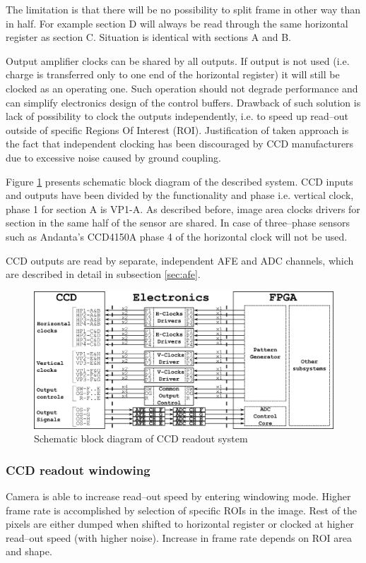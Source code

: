 The limitation is that there will be no possibility to split frame in other way than in half. For example section D will always be read through the same horizontal register as section C. Situation is identical with sections A and B.

Output amplifier clocks can be shared by all outputs. If output is not used (i.e. charge is transferred only to one end of the horizontal register) it will still be clocked as an operating one. Such operation should not degrade performance and can simplify electronics design of the control buffers. Drawback of such solution is lack of possibility to clock the outputs independently, i.e. to speed up read--out outside of specific Regions Of Interest (ROI). Justification of taken approach is the fact that independent clocking has been discouraged by CCD manufacturers due to excessive noise caused by ground coupling.


Figure \ref{fig:CCD_Readout} presents schematic block diagram of the described system. CCD inputs and outputs have been divided by the functionality and phase i.e. vertical clock, phase 1 for section A is VP1-A. As described before, image area clocks drivers for section in the same half of the sensor are shared. In case of three--phase sensors such as Andanta's CCD4150A phase 4 of the horizontal clock will not be used.


CCD outputs are read by separate, independent AFE and ADC channels, which are described in detail in subsection \ref{sec:afe}.

\begin{figure}[H]
\centering
\includegraphics[width=\textwidth]{pict/CCD_Readout.png}
\caption{Schematic block diagram of CCD readout system}
\label{fig:CCD_Readout}
\end{figure}




\subsubsection{CCD readout windowing}
\label{sec:windowing}
Camera is able to increase read--out speed by entering windowing mode. Higher frame rate is accomplished by selection of specific ROIs in the image. Rest of the pixels are either dumped when shifted to horizontal register or clocked at higher read--out speed (with higher noise). Increase in frame rate depends on ROI area and shape. 

